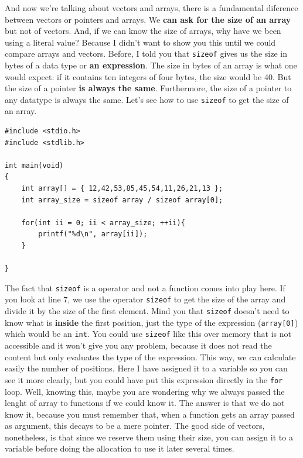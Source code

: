 \documentclass[a4paper]{article}
\begin{document}
And now we're talking about vectors and arrays, there is a fundamental diference
between vectors or pointers and arrays. We \textbf{can ask for the size of an
array} but not of vectors. And, if we can know the
size of arrays, why have we been using a literal value? Because I didn't want to
show you this until we could compare arrays and vectors. Before, I told you that
\verb!sizeof! gives us the size in bytes of a data type or
\textbf{an expression}. The size in bytes of an array is what one would expect:
if it contains ten integers of four bytes, the size would be 40. But the size of
a pointer \textbf{is always the same}. Furthermore, the size of a pointer to any
datatype is always the same. Let's see how to use \verb!sizeof! to get the size
of an array.

\noindent
\begin{minipage}[H]{\linewidth}
\mbox{}
\begin{lstlisting}[style=C, label={lst:sizeofArraysPointers},
caption={Difference of \texttt{sizeof} between pointers and arrays}]
#include <stdio.h>
#include <stdlib.h>

int main(void)
{
    int array[] = { 12,42,53,85,45,54,11,26,21,13 };
    int array_size = sizeof array / sizeof array[0];

    for(int ii = 0; ii < array_size; ++ii){
        printf("%d\n", array[ii]);
    }

}
\end{lstlisting}
\end{minipage}

The fact that \verb!sizeof! is a operator and not a function comes into play
here. If you look at line 7, we use the operator \verb!sizeof! to get the size
of the array and divide it by the size of the first element. Mind you that
\verb!sizeof! doesn't need to know what is \textbf{inside} the first position,
just the type of the expression (\verb!array[0]!) which would be an \verb"int".
You could use \verb!sizeof! like this over memory that is not accessible and
it won't give you any problem, because it does not read the content but only
evaluates the type of the expression.
This way, we can calculate
easily the number of positions. Here I have assigned it to a variable so you
can see it more clearly, but you could have put this expression directly in the
\verb!for! loop. Well, knowing this, maybe you are wondering why we always
passed the lenght of array to functions if we could know it. The answer is that
we do not know it, because you must remember that, when a function gets an array
passed as argument, this decays to be a mere pointer. The good side of vectors,
nonetheless, is that since we reserve them using their size, you can assign it
to a variable before doing the allocation to use it later several times.
\end{document}
